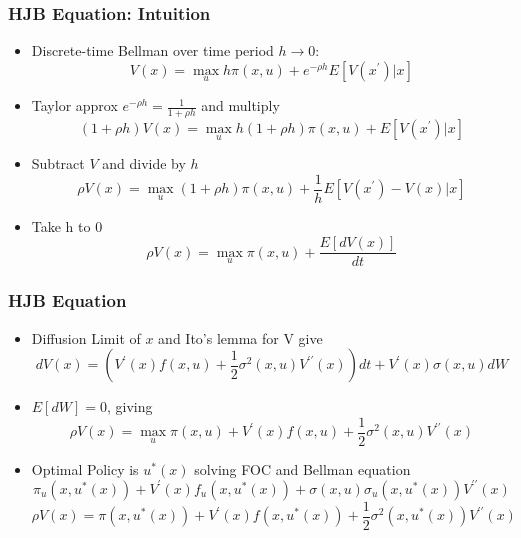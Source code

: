 \documentclass[bigger,handout]{beamer}
\begin{document}
\begin{frame}%
\frametitle{HJB Equation: Intuition}

\begin{itemize}

\item Discrete-time Bellman over time period $h\rightarrow 0$:%
\begin{equation*}
V(x)=\max_{u}h\pi \left( x,u\right) +e^{-\rho h}E[V(x^{\prime})|x]
\end{equation*}
\item Taylor approx $e^{-\rho h}=\frac{1}{1+\rho h}$ and multiply
\begin{equation*}
(1+\rho h)V(x)=\max_{u}h(1+\rho h)\pi \left( x,u\right) +E[V(x^{\prime})|x]
\end{equation*}
\item Subtract $V$ and divide by $h$
\begin{equation*}
\rho V(x)=\max_{u}(1+\rho h)\pi \left( x,u\right) +\frac{1}{h}E[V(x^{\prime})-V(x)|x]
\end{equation*}
\item Take h to $0$
\begin{equation*}
\rho V(x)=\max_{u}\pi \left( x,u\right) +\frac{E[dV(x)]}{dt}
\end{equation*}

\end{itemize}


\end{frame}%




\begin{frame}%
\frametitle{HJB Equation}

\begin{itemize}

\item Diffusion Limit of $x$ and Ito's lemma for V give
\begin{equation*}
dV(x)=(V^{\prime}(x)f(x,u)+\frac{1}{2}\sigma^2(x,u)V^{\prime\prime}(x)) dt+V^{\prime}(x)\sigma(x,u)dW
\end{equation*}
\item $E[dW]=0$, giving
\begin{equation*}
\rho V(x)=\max_{u}\pi \left( x,u\right) +V^{\prime}(x)f(x,u)+\frac{1}{2}\sigma^2(x,u)V^{\prime\prime}(x)
\end{equation*}
\item Optimal Policy is $u^*(x)$ solving FOC and Bellman equation
\begin{equation*}
\pi_u \left( x,u^*(x)\right) +V^{\prime}(x)f_u(x,u^*(x))+\sigma(x,u)\sigma_u(x,u^*(x))V^{\prime\prime}(x)
\end{equation*}
\begin{equation*}
\rho V(x)=\pi \left( x,u^*(x)\right) +V^{\prime}(x)f(x,u^*(x))+\frac{1}{2}\sigma^2(x,u^*(x))V^{\prime\prime}(x)
\end{equation*}

\end{itemize}


\end{frame}%
\end{document}
